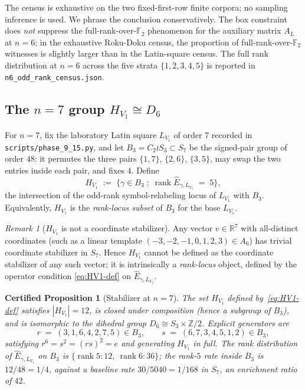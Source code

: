 \documentclass[11pt,a4paper]{article}
\newtheorem{certprop}[theorem]{Certified Proposition}
\theoremstyle{definition}
\theoremstyle{remark}
\newtheorem{remark}[theorem]{Remark}
\providecommand{\Z}{\mathbb{Z}}
\providecommand{\R}{\mathbb{R}}
\providecommand{\rank}{\operatorname{rank}}
\begin{document}
The census is exhaustive on the two fixed-first-row finite corpora; no
sampling inference is used. We phrase the conclusion conservatively. The box constraint does
\emph{not} suppress the full-rank-over-$\mathbb{F}_2$ phenomenon for
the auxiliary matrix $A_L$ at $n = 6$; in the exhaustive Roku-Doku
census, the proportion of full-rank-over-$\mathbb{F}_2$ witnesses is
slightly larger than in the Latin-square census.
The full rank distribution at $n = 6$ across the five strata
$\{1, 2, 3, 4, 5\}$ is reported in
\texttt{n6\_odd\_rank\_census.json}.

\subsection{\texorpdfstring{The $n = 7$ group $H_{V_1} \cong D_6$}{The n=7 group HV1 is D6}}\label{sec:n7}

For $n = 7$, fix the laboratory Latin square $L_{V_1}$ of order $7$
recorded in \texttt{scripts/phase\_9\_15.py}, and let
$B_3 = C_2 \wr S_3 \subset S_7$ be the signed-pair group of order $48$:
it permutes the three pairs $\{1,7\}$, $\{2,6\}$, $\{3,5\}$, may swap
the two entries inside each pair, and fixes $4$. Define
\begin{equation}\label{eq:HV1-def}
   H_{V_1} \;:=\; \bigl\{\gamma \in B_3 \;:\;
      \rank \widehat{E}_{\gamma, L_{V_1}} \;=\; 5 \bigr\},
\end{equation}
the intersection of the odd-rank symbol-relabeling locus of
$L_{V_1}$ with $B_3$. Equivalently, $H_{V_1}$ is the
\emph{rank-locus subset} of $B_3$ for the base $L_{V_1}$.

\begin{remark}[$H_{V_1}$ is not a coordinate stabilizer]
\label{rem:HV1-not-coord-stab}
Any vector $v \in \R^7$ with all-distinct coordinates (such as a
linear template $(-3,-2,-1,0,1,2,3) \in A_6$) has trivial coordinate
stabilizer in $S_7$. Hence $H_{V_1}$ cannot be defined as the
coordinate stabilizer of any such vector; it is intrinsically a
\emph{rank-locus} object, defined by the operator condition
\eqref{eq:HV1-def} on $\widehat{E}_{\gamma, L_{V_1}}$.
\end{remark}

\begin{certprop}[Stabilizer at $n = 7$]\label{thm:n7-D6}
The set $H_{V_1}$ defined by~\eqref{eq:HV1-def} satisfies
$|H_{V_1}| = 12$, is closed under composition (hence a subgroup of
$B_3$), and is isomorphic to the dihedral group $D_6 \cong S_3
\times \Z/2$. Explicit generators are
\begin{equation*}
   r \;=\; (3,1,6,4,2,7,5) \in B_3,
   \qquad
   s \;=\; (6,7,3,4,5,1,2) \in B_3,
\end{equation*}
satisfying $r^6 = s^2 = (rs)^2 = e$ and generating $H_{V_1}$ in full.
The rank distribution of $\widehat{E}_{\gamma, L_{V_1}}$ on $B_3$ is
$\{\rank 5 : 12,\ \rank 6 : 36\}$; the rank-$5$ rate inside $B_3$
is $12/48 = 1/4$, against a baseline rate $30/5040 = 1/168$ in
$S_7$, an enrichment ratio of $42$.
\end{certprop}
\end{document}
